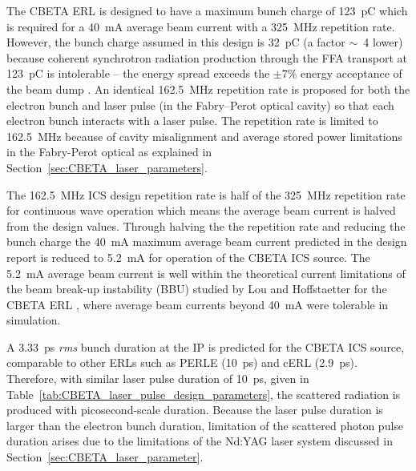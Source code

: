 \documentclass[../main.tex]{subfiles}
\begin{document}
The CBETA ERL \cite{hoffstaetter2017cbeta} is designed to have a maximum bunch charge of 123~\si{\pico\coulomb} which is required for a 40~\si{\milli\ampere} average beam current with a 325~\si{\mega\hertz} repetition rate. However, the bunch charge assumed in this design is 32~\si{\pico\coulomb} (a factor $\sim$~4 lower) because coherent synchrotron radiation production through the FFA transport at 123~\si{\pico\coulomb} is intolerable -- the energy spread exceeds the $\pm 7$\% energy acceptance of the beam dump \cite{lou2020coherent}. An identical 162.5~\si{\mega\hertz} repetition rate is proposed for both the electron bunch and laser pulse (in the Fabry--Perot optical cavity) so that each electron bunch interacts with a laser pulse. The repetition rate is limited to 162.5~\si{\mega\hertz} because of cavity misalignment and average stored power limitations in the Fabry-Perot optical as explained in Section~\ref{sec:CBETA_laser_parameters}. 

The 162.5~\si{\mega\hertz} ICS design repetition rate is half of the  325~\si{\mega\hertz} repetition rate for continuous wave operation \cite{hoffstaetter2017cbeta} which means the average beam current is halved from the design values. Through halving the the repetition rate and reducing the bunch charge the 40~\si{\milli\ampere} maximum average beam current predicted in the design report \cite{hoffstaetter2017cbeta} is reduced to 5.2~\si{\milli\ampere} for operation of the CBETA ICS source. The 5.2~\si{\milli\ampere} average beam current is well within the theoretical current limitations of the beam break-up instability (BBU) studied by Lou and Hoffstaetter for the CBETA ERL \cite{lou2019beam}, where average beam currents beyond 40~\si{\milli\ampere} were tolerable in simulation.   

A 3.33~\si{\pico\second} \textit{rms} bunch duration at the IP is predicted for the CBETA ICS source, comparable to other ERLs such as PERLE \cite{angal2018perle} (10~\si{\pico\second}) and cERL \cite{akagi2016narrow} (2.9~\si{\pico\second}). Therefore, with similar laser pulse duration of 10~\si{\pico\second}, given in Table~\ref{tab:CBETA_laser_pulse_design_parameters}, the scattered radiation is produced with picosecond-scale duration. Because the laser pulse duration is larger than the electron bunch duration, limitation of the scattered photon pulse duration arises due to the limitations of the Nd:YAG laser system discussed in Section~\ref{sec:CBETA_laser_parameter}.
\end{document}
